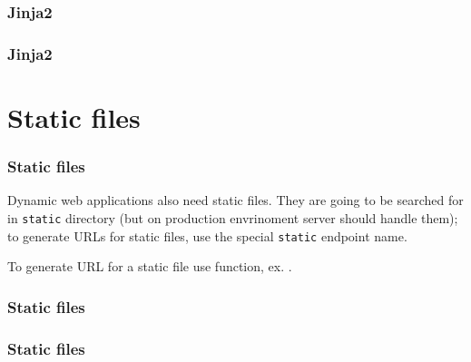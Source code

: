 \documentclass{beamer}
\begin{document}
\begin{frame}
  \frametitle{Jinja2}

  
\end{frame}

\begin{frame}
  \frametitle{Jinja2}
  \begin{figure}
    
    
    \caption{}
  \end{figure}


\end{frame}

\section{Static files}

\begin{frame}
  \frametitle{Static files}

  Dynamic web applications also need static files. They are going to be searched for in \texttt{static} directory
  (but on production envrinoment server should handle them); to generate URLs for static files, use the special
  \texttt{static} endpoint name.

  \vspace{3mm} \pause

  To generate URL for a static file use  function, ex. .

\end{frame}

\begin{frame}
  \frametitle{Static files}

  \begin{figure}
    \caption{}
  \end{figure}
\end{frame}

\begin{frame}
  \frametitle{Static files}

  \begin{figure}
    
    \caption{}
  \end{figure}

\end{frame}
\end{document}
